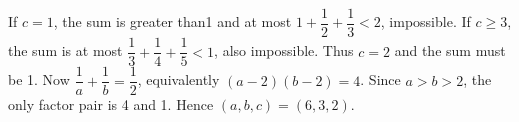 If $c=1$, the sum is greater than1 and at most $1+\dfrac{1}{2}+\dfrac{1}{3}<2$, impossible. If $c\ge3$, the sum is at most $\dfrac{1}{3}+\dfrac{1}{4}+\dfrac{1}{5}<1$, also impossible. Thus $c=2$ and the sum must be 1. Now $\dfrac{1}{a}+\dfrac{1}{b}=\dfrac{1}{2}$, equivalently $(a-2)(b-2)=4$. Since $a>b>2$, the only factor pair is 4 and 1. Hence $\boxed{(a,b,c)=(6,3,2)}$.
